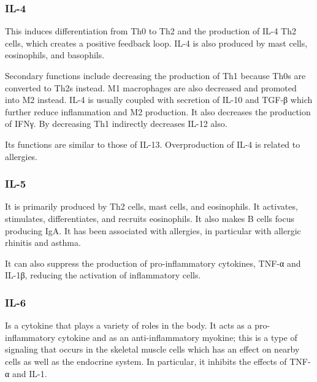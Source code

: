 

\subsubsection{IL-4}
\label{in:IL4}

This induces differentiation from Th0 to Th2 and the production of IL-4 Th2 cells, which creates a positive feedback loop. IL-4 is also produced by mast cells, eosinophils, and basophils.

Secondary functions include decreasing the production of Th1 because Th0s are converted to Th2s instead. M1 macrophages are also decreased and promoted into M2 instead. IL-4 is usually coupled with secretion of IL-10 and TGF-β which further reduce inflammation and M2 production. It also decreases the production of IFNγ. By decreasing Th1 indirectly decreases IL-12 also.

Its functions are similar to those of IL-13. Overproduction of IL-4 is related to allergies.

\subsubsection{IL-5}
\label{in:IL5}

It is primarily produced by Th2 cells, mast cells, and eosinophils. It activates, stimulates, differentiates, and recruits eosinophils. It also makes B cells focus producing IgA. It has been associated with allergies, in particular with allergic rhinitis and asthma.

It can also suppress the production of pro-inflammatory cytokines, TNF-α and IL-1β, reducing the activation of inflammatory cells.

\subsubsection{IL-6}
\label{in:IL6}

Is a cytokine that plays a variety of roles in the body. It acts as a pro-inflammatory cytokine and as an anti-inflammatory myokine; this is a type of signaling that occurs in the skeletal muscle cells which has an effect on nearby cells as well as the endocrine system. In particular, it inhibits the effects of TNF-α and IL-1.

